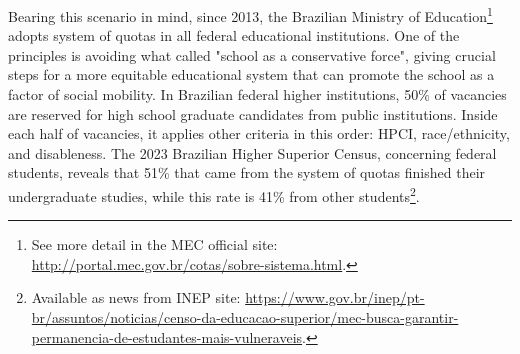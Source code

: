 Bearing this scenario in mind, since 2013, the Brazilian Ministry of Education\footnote{See more detail in the \gls{MEC} official site: \url{http://portal.mec.gov.br/cotas/sobre-sistema.html}.} adopts system of quotas in all federal educational institutions. One of the principles is avoiding what  called "school as a conservative force", giving crucial steps for a more equitable educational system that can promote the school as a factor of social mobility. In Brazilian federal higher institutions, 50\% of vacancies are reserved for high school graduate candidates from public institutions. Inside each half of vacancies, it applies other criteria in this order: \gls{HPCI}, race/ethnicity, and disableness. The 2023 Brazilian Higher Superior Census, concerning federal students, reveals that 51\% that came from the system of quotas finished their undergraduate studies, while this rate is 41\% from other students\footnote{Available as news from \gls{INEP} site: \url{https://www.gov.br/inep/pt-br/assuntos/noticias/censo-da-educacao-superior/mec-busca-garantir-permanencia-de-estudantes-mais-vulneraveis}.}.